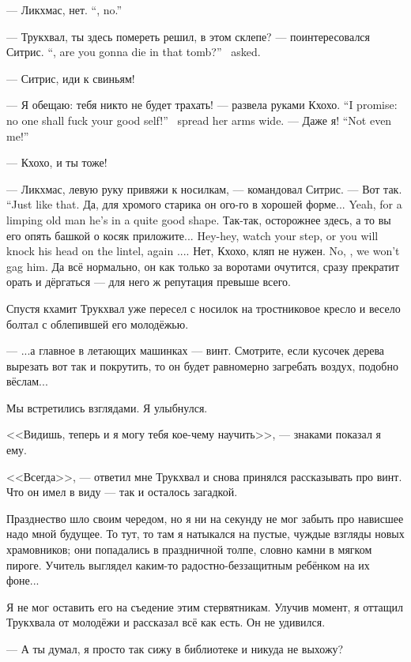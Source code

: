 {--- Ликхмас, нет.}
{``\Likchmas, no.''}

{--- Трукхвал, ты здесь помереть решил, в этом склепе? --- поинтересовался Ситрис.}
{``\Trukchual, are you gonna die in that tomb?'' \Sitris\ asked.}

--- Ситрис, иди к свиньям!

{--- Я обещаю: тебя никто не будет трахать! --- развела руками Кхохо.}
{``I promise: no one shall fuck your good self!'' \Kchoho\ spread her arms wide.}
{--- Даже я!}
{``Not even me!''}

--- Кхохо, и ты тоже!

--- Ликхмас, левую руку привяжи к носилкам, --- командовал Ситрис.
{--- Вот так.}
{``Just like that.}
{Да, для хромого старика он ого-го в хорошей форме...}
{Yeah, for a limping old man he's in a quite good shape.}
{Так-так, осторожнее здесь, а то вы его опять башкой о косяк приложите...}
{Hey-hey, watch your step, or you will knock his head on the lintel, again ....}
{Нет, Кхохо, кляп не нужен.}
{No, \Kchoho, we won't gag him.}
Да всё нормально, он как только за воротами очутится, сразу прекратит орать и дёргаться --- для него ж репутация превыше всего.

Спустя кхамит Трукхвал уже пересел с носилок на тростниковое кресло и весело болтал с облепившей его молодёжью.

---  ...а главное в летающих машинках --- винт.
Смотрите, если кусочек дерева вырезать вот так и покрутить, то он будет равномерно загребать воздух, подобно вёслам...

Мы встретились взглядами.
Я улыбнулся.

<<Видишь, теперь и я могу тебя кое-чему научить>>, --- знаками показал я ему.

<<Всегда>>, --- ответил мне Трукхвал и снова принялся рассказывать про винт.
Что он имел в виду --- так и осталось загадкой.

Празднество шло своим чередом, но я ни на секунду не мог забыть про нависшее надо мной будущее.
То тут, то там я натыкался на пустые, чуждые взгляды новых храмовников;
они попадались в праздничной толпе, словно камни в мягком пироге.
Учитель выглядел каким-то радостно-беззащитным ребёнком на их фоне...

Я не мог оставить его на съедение этим стервятникам.
Улучив момент, я оттащил Трукхвала от молодёжи и рассказал всё как есть.
Он не удивился.

--- А ты думал, я просто так сижу в библиотеке и никуда не выхожу?

